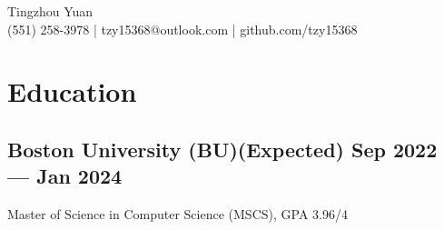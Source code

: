 \documentclass[a4,12pt]{article}
\newcommand{\hskills}[1]{
\textbf{\bfseries #1} }
\begin{document}
\vspace{-0.5cm}
\begin{center}
    \begin{minipage}[b]{0.7\textwidth}
            \centering
            {\huge Tingzhou Yuan} \\ %
            \vspace{0.1cm}
           (551) 258-3978  | tzy15368@outlook.com | github.com/tzy15368
    \end{minipage}%
    
\vspace{-0.35cm} 
\end{center}
\vspace{-1cm}

\section{\textbf{Education}}
\vspace{-0.2cm}
\subsection*{Boston University (BU)\hfill \textbf{(Expected) Sep 2022 --- Jan 2024}}
Master of Science in Computer Science (MSCS), GPA 3.96/4\\
\end{document}
